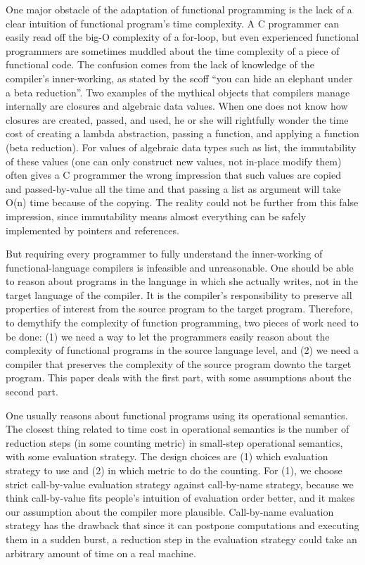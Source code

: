 \documentclass[preprint]{sigplanconf}
\begin{document}
One major obstacle of the adaptation of functional programming is the lack of a clear intuition of functional program's time complexity. A C programmer can easily read off the big-O complexity of a for-loop, but even experienced functional programmers are sometimes muddled about the time complexity of a piece of functional code. The confusion comes from the lack of knowledge of the compiler's inner-working, as stated by the scoff ``you can hide an elephant under a beta reduction''. Two examples of the mythical objects that compilers manage internally are closures and algebraic data values. When one does not know how closures are created, passed, and used, he or she will rightfully wonder the time cost of creating a lambda abstraction, passing a function, and applying a function (beta reduction). For values of algebraic data types such as list, the immutability of these values (one can only construct new values, not in-place modify them) often gives a C programmer the wrong impression that such values are copied and passed-by-value all the time and that passing a list as argument will take O(n) time because of the copying. The reality could not be further from this false impression, since immutability means almost everything can be safely implemented by pointers and references.

But requiring every programmer to fully understand the inner-working of functional-language compilers is infeasible and unreasonable. One should be able to reason about programs in the language in which she actually writes, not in the target language of the compiler. It is the compiler's responsibility to preserve all properties of interest from the source program to the target program. Therefore, to demythify the complexity of function programming, two pieces of work need to be done: (1) we need a way to let the programmers easily reason about the complexity of functional programs in the source language level, and (2) we need a compiler that preserves the complexity of the source program downto the target program. This paper deals with the first part, with some assumptions about the second part. 

One usually reasons about functional programs using its operational semantics. The closest thing related to time cost in operational semantics is the number of reduction steps (in some counting metric) in small-step operational semantics, with some evaluation strategy. The design choices are (1) which evaluation strategy to use and (2) in which metric to do the counting. For (1), we choose strict call-by-value evaluation strategy against call-by-name strategy, because we think call-by-value fits people's intuition of evaluation order better, and it makes our assumption about the compiler more plausible. Call-by-name evaluation strategy has the drawback that since it can postpone computations and executing them in a sudden burst, a reduction step in the evaluation strategy could take an arbitrary amount of time on a real machine.
\end{document}
